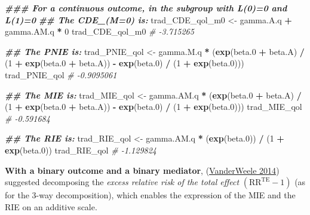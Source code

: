 \documentclass[
]{book}
\newenvironment{Shaded}{\begin{snugshade}}{\end{snugshade}}
\newcommand{\CommentTok}[1]{\textcolor[rgb]{0.56,0.35,0.01}{\textit{#1}}}
\newcommand{\DecValTok}[1]{\textcolor[rgb]{0.00,0.00,0.81}{#1}}
\newcommand{\DocumentationTok}[1]{\textcolor[rgb]{0.56,0.35,0.01}{\textbf{\textit{#1}}}}
\newcommand{\FloatTok}[1]{\textcolor[rgb]{0.00,0.00,0.81}{#1}}
\newcommand{\FunctionTok}[1]{\textcolor[rgb]{0.13,0.29,0.53}{\textbf{#1}}}
\newcommand{\NormalTok}[1]{#1}
\newcommand{\OtherTok}[1]{\textcolor[rgb]{0.56,0.35,0.01}{#1}}
\newcommand{\SpecialCharTok}[1]{\textcolor[rgb]{0.81,0.36,0.00}{\textbf{#1}}}
\begin{document}
\begin{Shaded}
\begin{Highlighting}[]
\DocumentationTok{\#\#\# For a continuous outcome, in the subgroup with L(0)=0 and L(1)=0}
\DocumentationTok{\#\# The CDE\_(M=0) is:}
\NormalTok{trad\_CDE\_qol\_m0 }\OtherTok{\textless{}{-}}\NormalTok{ gamma.A.q }\SpecialCharTok{+}\NormalTok{ gamma.AM.q }\SpecialCharTok{*} \DecValTok{0}
\NormalTok{trad\_CDE\_qol\_m0}
\CommentTok{\# {-}3.715265}

\DocumentationTok{\#\# The PNIE is:}
\NormalTok{trad\_PNIE\_qol }\OtherTok{\textless{}{-}}\NormalTok{ gamma.M.q }\SpecialCharTok{*}
\NormalTok{  (}\FunctionTok{exp}\NormalTok{(beta}\FloatTok{.0} \SpecialCharTok{+}\NormalTok{ beta.A) }\SpecialCharTok{/}
\NormalTok{     (}\DecValTok{1} \SpecialCharTok{+} \FunctionTok{exp}\NormalTok{(beta}\FloatTok{.0} \SpecialCharTok{+}\NormalTok{ beta.A)) }\SpecialCharTok{{-}} \FunctionTok{exp}\NormalTok{(beta}\FloatTok{.0}\NormalTok{) }\SpecialCharTok{/}\NormalTok{ (}\DecValTok{1} \SpecialCharTok{+} \FunctionTok{exp}\NormalTok{(beta}\FloatTok{.0}\NormalTok{)))}
\NormalTok{trad\_PNIE\_qol}
\CommentTok{\# {-}0.9095061}

\DocumentationTok{\#\# The MIE is:}
\NormalTok{trad\_MIE\_qol }\OtherTok{\textless{}{-}}\NormalTok{ gamma.AM.q }\SpecialCharTok{*}
\NormalTok{  (}\FunctionTok{exp}\NormalTok{(beta}\FloatTok{.0} \SpecialCharTok{+}\NormalTok{ beta.A) }\SpecialCharTok{/}\NormalTok{ (}\DecValTok{1} \SpecialCharTok{+} \FunctionTok{exp}\NormalTok{(beta}\FloatTok{.0} \SpecialCharTok{+}\NormalTok{ beta.A)) }\SpecialCharTok{{-}}
     \FunctionTok{exp}\NormalTok{(beta}\FloatTok{.0}\NormalTok{) }\SpecialCharTok{/}\NormalTok{ (}\DecValTok{1} \SpecialCharTok{+} \FunctionTok{exp}\NormalTok{(beta}\FloatTok{.0}\NormalTok{)))}
\NormalTok{trad\_MIE\_qol}
\CommentTok{\# {-}0.591684}

\DocumentationTok{\#\# The RIE is:}
\NormalTok{trad\_RIE\_qol }\OtherTok{\textless{}{-}}\NormalTok{ gamma.AM.q }\SpecialCharTok{*}\NormalTok{ (}\FunctionTok{exp}\NormalTok{(beta}\FloatTok{.0}\NormalTok{)) }\SpecialCharTok{/}\NormalTok{ (}\DecValTok{1} \SpecialCharTok{+} \FunctionTok{exp}\NormalTok{(beta}\FloatTok{.0}\NormalTok{))}
\NormalTok{trad\_RIE\_qol}
\CommentTok{\# {-}1.129824}
\end{Highlighting}
\end{Shaded}

\textbf{With a binary outcome and a binary mediator}, (\protect\hyperlink{ref-vanderweele2014}{VanderWeele 2014}) suggested decomposing the \emph{excess relative risk of the total effect} \((\text{RR}^{\text{TE}}-1)\) (as for the 3-way decomposition), which enables the expression of the MIE and the RIE on an additive scale.
\end{document}
